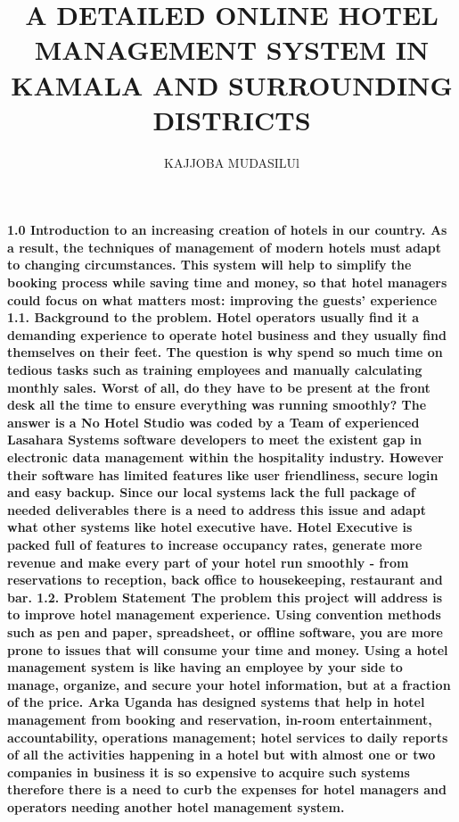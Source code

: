 \documentclass{article}
\begin{document}
\title{A DETAILED ONLINE HOTEL MANAGEMENT SYSTEM IN KAMALA AND SURROUNDING DISTRICTS}

\author{KAJJOBA MUDASILUl}
\maketitle
\paragraph{1.0 Introduction to an increasing creation of hotels in our country. As a result, the techniques of
management of modern hotels must adapt to changing circumstances. This system will help
to simplify the booking process while saving time and money, so that hotel managers could focus on what matters most: improving the guests’ experience
1.1. Background to the problem.
Hotel operators usually find it a demanding experience to operate hotel business and they usually find themselves on their feet. The question is why spend so much time on tedious tasks such as training employees and manually calculating monthly sales. Worst of all, do they have to be present at the front desk all the time to ensure everything was running smoothly? The answer is a No
Hotel Studio was coded by a Team of experienced Lasahara Systems software developers to meet the existent gap in electronic data management within the hospitality industry. However their software has limited features like user friendliness, secure login and easy backup. Since our local systems lack the full package of needed deliverables there is a need to address this issue and adapt what other systems like hotel executive have. Hotel Executive is packed full of features to increase occupancy rates, generate more revenue and make every part of your hotel run smoothly - from reservations to reception, back office to housekeeping, restaurant and bar.
1.2. Problem Statement The problem this project will address is to improve hotel management experience. Using convention methods such as pen and paper, spreadsheet, or offline software, you are more prone to issues that will consume your time and money. Using a hotel management system is like having an employee by your side to manage, organize, and secure your hotel information, but at a fraction of the price. Arka Uganda has designed systems that help in hotel management from booking and reservation, in-room entertainment, accountability, operations management; hotel services to daily reports of all the activities happening in a hotel but with almost one or two companies in business it is so expensive to acquire such systems therefore there is a need to curb the expenses for hotel managers and operators needing another hotel management system. 
}
\end{document}
